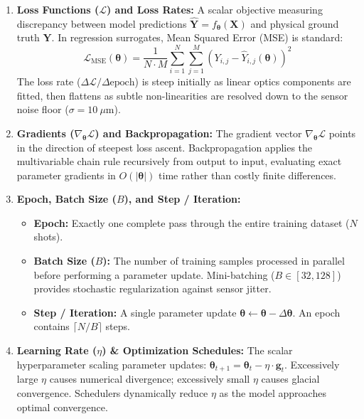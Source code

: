 \documentclass[11pt,a4paper]{article}
\begin{document}
\begin{enumerate}
    \item \textbf{Loss Functions ($\mathcal{L}$) and Loss Rates:}
    A scalar objective measuring discrepancy between model predictions $\hat{\mathbf{Y}} = f_{\boldsymbol{\theta}}(\mathbf{X})$ and physical ground truth $\mathbf{Y}$. In regression surrogates, Mean Squared Error (MSE) is standard:
    \begin{equation}
        \mathcal{L}_{\text{MSE}}(\boldsymbol{\theta}) = \frac{1}{N \cdot M} \sum_{i=1}^N \sum_{j=1}^M \left( Y_{i,j} - \hat{Y}_{i,j}(\boldsymbol{\theta}) \right)^2
    \end{equation}
    The loss rate ($\Delta \mathcal{L} / \Delta \text{epoch}$) is steep initially as linear optics components are fitted, then flattens as subtle non-linearities are resolved down to the sensor noise floor ($\sigma = 10\ \mu\text{m}$).

    \item \textbf{Gradients ($\nabla_{\boldsymbol{\theta}}\mathcal{L}$) and Backpropagation:}
    The gradient vector $\nabla_{\boldsymbol{\theta}}\mathcal{L}$ points in the direction of steepest loss ascent. Backpropagation applies the multivariable chain rule recursively from output to input, evaluating exact parameter gradients in $O(|\boldsymbol{\theta}|)$ time rather than costly finite differences.

    \item \textbf{Epoch, Batch Size ($B$), and Step / Iteration:}
    \begin{itemize}
        \item \textbf{Epoch:} Exactly one complete pass through the entire training dataset ($N$ shots).
        \item \textbf{Batch Size ($B$):} The number of training samples processed in parallel before performing a parameter update. Mini-batching ($B \in [32, 128]$) provides stochastic regularization against sensor jitter.
        \item \textbf{Step / Iteration:} A single parameter update $\boldsymbol{\theta} \leftarrow \boldsymbol{\theta} - \Delta \boldsymbol{\theta}$. An epoch contains $\lceil N / B \rceil$ steps.
    \end{itemize}

    \item \textbf{Learning Rate ($\eta$) \& Optimization Schedules:}
    The scalar hyperparameter scaling parameter updates: $\boldsymbol{\theta}_{t+1} = \boldsymbol{\theta}_t - \eta \cdot \mathbf{g}_t$. Excessively large $\eta$ causes numerical divergence; excessively small $\eta$ causes glacial convergence. Schedulers dynamically reduce $\eta$ as the model approaches optimal convergence.


\end{enumerate}
\end{document}
